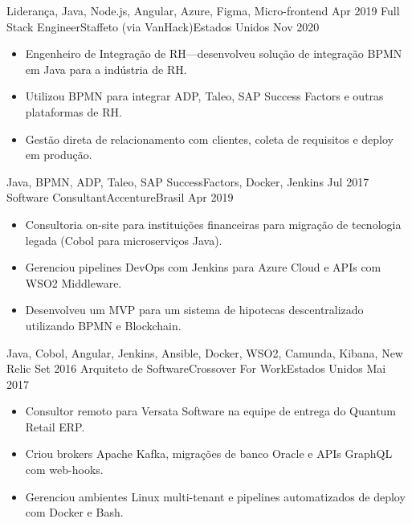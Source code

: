 \begin{experiences}
{                    }
                    {Liderança, Java, Node.js, Angular, Azure, Figma, Micro-frontend}
  \emptySeparator
  \experience
    {Apr 2019} {Full Stack Engineer}{Staffeto (via VanHack)}{Estados Unidos}
    {Nov 2020}    {
                      \begin{itemize}
                        \item Engenheiro de Integração de RH—desenvolveu solução de integração BPMN em Java para a indústria de RH.
                        \item Utilizou BPMN para integrar ADP, Taleo, SAP Success Factors e outras plataformas de RH.
                        \item Gestão direta de relacionamento com clientes, coleta de requisitos e deploy em produção.
                      \end{itemize}
                    }
                    {Java, BPMN, ADP, Taleo, SAP SuccessFactors, Docker, Jenkins}
  \emptySeparator
  \experience
    {Jul 2017}     {Software Consultant}{Accenture}{Brasil}
    {Apr 2019}    {
                      \begin{itemize}
                        \item Consultoria on-site para instituições financeiras para migração de tecnologia legada (Cobol para microserviços Java).
                        \item Gerenciou pipelines DevOps com Jenkins para Azure Cloud e APIs com WSO2 Middleware.
                        \item Desenvolveu um MVP para um sistema de hipotecas descentralizado utilizando BPMN e Blockchain.
                      \end{itemize}
                    }
                    {Java, Cobol, Angular, Jenkins, Ansible, Docker, WSO2, Camunda, Kibana, New Relic}
  \emptySeparator
  \experience
    {Set 2016}     {Arquiteto de Software}{Crossover For Work}{Estados Unidos}
    {Mai 2017}    {
                      \begin{itemize}
                        \item Consultor remoto para Versata Software na equipe de entrega do Quantum Retail ERP.
                        \item Criou brokers Apache Kafka, migrações de banco Oracle e APIs GraphQL com web-hooks.
                        \item Gerenciou ambientes Linux multi-tenant e pipelines automatizados de deploy com Docker e Bash.
                      \end{itemize}
}
\end{experiences}

